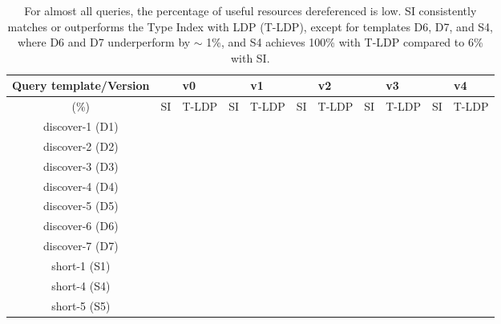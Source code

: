 \begin{table}[htbp]
	\begin{center}
		\begin{tabular}{|c|c|c|c|c|c|c|c|c|c|c|}
			\hline
            \multicolumn{1}{|c}{Query template/Version} & \multicolumn{2}{|c|}{v0} & \multicolumn{2}{|c|}{v1} & \multicolumn{2}{|c|}{v2} & \multicolumn{2}{|c|}{v3} & \multicolumn{2}{|c|}{v4} \\
			\hline
            (\%) & SI  & T-LDP & SI & T-LDP & SI & T-LDP& SI & T-LDP & SI & T-LDP \\
            \hline
			discover-1 (D1) & {} & {} & {} & {} & {} & {} & {} & {} & {} & {} \\
            \hline
            discover-2 (D2) & {} & {} & {} & {} & {} & {} & {} & {} & {} & {} \\
			\hline
            discover-3 (D3) & {} & {} & {} & {} & {} & {} & {} & {} & {} & {} \\
			\hline
            discover-4 (D4) & {} & {} & {} & {} & {} & {} & {} & {} & {} & {} \\
			\hline
            discover-5 (D5) & {} & {} & {} & {} & {} & {} & {} & {} & {} & {} \\
			\hline
            discover-6 (D6) & {} & {} & {} & {} & {} & {} & {} & {} & {} & {} \\
			\hline
            discover-7 (D7) & {} & {} & {} & {} & {} & {} & {} & {} & {} & {} \\
			\hline
            short-1 (S1) & {} & {} & {} & {} & {} & {} & {} & {} & {} & {} \\
			\hline
            short-4 (S4) & {} & {} & {} & {} & {} & {} & {} & {} & {} & {} \\
			\hline
            short-5 (S5) & {} & {} & {} & {} & {} & {} & {} & {} & {} & {} \\
			\hline
		\end{tabular}
	\end{center}
	\caption{
        For almost all queries, the percentage of useful resources dereferenced is low. 
		SI consistently matches or outperforms the Type Index with LDP (T-LDP), except for templates D6, D7, and S4, where D6 and D7 underperform by $\sim$ 1\%, and S4 achieves 100\% with T-LDP compared to 6\% with SI.
		}
	\label{tab:ratioUsefulResources}
\end{table}